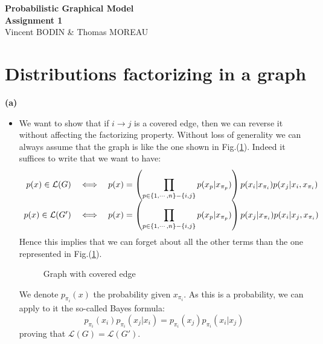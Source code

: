 \documentclass[10pt]{article}
\begin{document}
\begin{center}
\huge\textbf{Probabilistic Graphical Model\\ \Large
Assignment 1}\normalsize \\
\vspace{0.5cm}
Vincent BODIN \& Thomas MOREAU
\end{center}

\hrulefill
\vspace{1cm}


\section{Distributions factorizing in a graph}


\textbf{(a) }\begin{itemize}
\item We want to show that if $i \rightarrow j$ is a covered edge, then we can reverse it without affecting the factorizing property. Without loss of generality we can always assume that the graph is like the one shown in Fig.(\ref{fig1}). Indeed it suffices to write that we want to have:
\begin{equation}
\begin{array}{r l l}
p(x) \in \mathcal{L}(G) 	& \iff & \displaystyle p(x) = \left( \prod_{p\in \{1,\cdots, n\} - \{i,j\} } p(x_p | x_{\pi_p}) \right) p(x_i | x_{\pi_i}) p(x_j | x_i, x_{\pi_i}) \\ 
p(x) \in \mathcal{L}(G')  & \iff & \displaystyle p(x) = \left( \prod_{p\in \{1,\cdots, n\} - \{i,j\} } p(x_p | x_{\pi_p}) \right) p(x_j | x_{\pi_i}) p(x_i | x_j, x_{\pi_i})
\end{array}
\end{equation}
Hence this implies that we can forget about all the other terms than the one represented in Fig.(\ref{fig1}).
\begin{figure}[h!]
\centering
{}
\caption{Graph with covered edge}
\label{fig1}
\end{figure}

We denote $p_{\pi_i}(x)$ the probability given $x_{\pi_i}$. As this is a probability, we can apply to it the so-called Bayes formula: 
\begin{equation}
p_{\pi_i}(x_i) p_{\pi_i}(x_j | x_i) = p_{\pi_i}(x_j) p_{\pi_i}(x_i | x_j) 
\label{eq:}
\end{equation}
proving that $\mathcal{L}(G) = \mathcal{L}(G')$.



\end{itemize}
\end{document}
